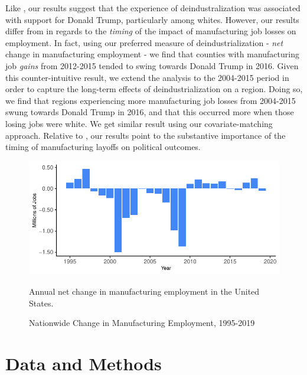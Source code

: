 \documentclass[]{AEA}
\begin{document}
Like \cite{Baccini21}, our results suggest that the experience of
deindustralization was associated with support for Donald Trump,
particularly among whites. However, our results differ from
\cite{Baccini21} in regards to the \emph{timing} of the impact of
manufacturing job losses on employment. In fact, using our preferred
measure of deindustrialization - \emph{net} change in manufacturing
employment - we find that counties with manufacturing job \emph{gains}
from 2012-2015 tended to swing towards Donald Trump in 2016. Given this
counter-intuitive result, we extend the analysis to the 2004-2015 period
in order to capture the long-term effects of deindustrialization on a
region. Doing so, we find that regions experiencing more manufacturing
job losses from 2004-2015 swung towards Donald Trump in 2016, and that
this occurred more when those losing jobs were white. We get similar
result using our covariate-matching approach. Relative to
\cite{Baccini21}, our results point to the substantive importance of the
timing of manufacturing layoffs on political outcomes.

\FloatBarrier
\begin{figure} \label{natlPlotTS}
\caption{Nationwide Change in Manufacturing Employment, 1995-2019}

\begin{center}\includegraphics{Final-Draft_files/figure-latex/unnamed-chunk-3-1} \end{center}



\FloatBarrier
\begin{figurenotes}
Annual net change in manufacturing employment in the United States. 
\end{figurenotes}
\end{figure}
\FloatBarrier

\section{Data and Methods} 
\label{datamethods}
\end{document}
